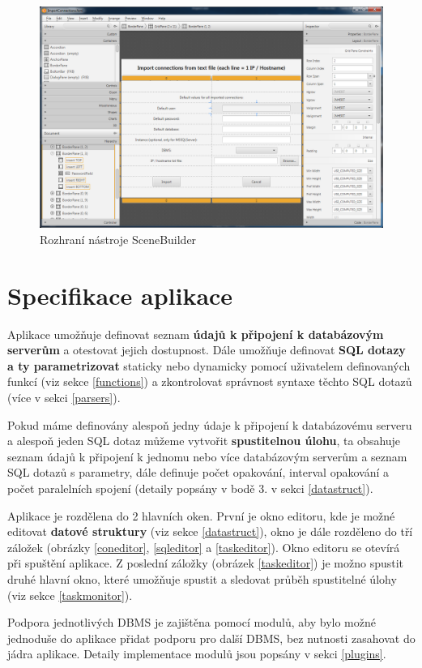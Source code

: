 \documentclass[czech,bachelor,public,dept460,male,cpdeclaration,twoside]{diploma}
\begin{document}
\begin{figure}[!h]\centering\includegraphics[width=1.0\textwidth]{Figures/SceneBuilder.png}\caption{Rozhraní nástroje SceneBuilder}
\end{figure}

\section{Specifikace aplikace}
Aplikace umožňuje definovat seznam \textbf{údajů k připojení k databázovým serverům} a otestovat jejich dostupnost. Dále umožňuje definovat \textbf{SQL dotazy a ty parametrizovat} staticky nebo dynamicky pomocí uživatelem definovaných funkcí (viz sekce \ref{functions}) a zkontrolovat správnost syntaxe těchto SQL dotazů (více v sekci \ref{parsers}).

Pokud máme definovány alespoň jedny údaje k připojení k databázovému serveru a alespoň jeden SQL dotaz můžeme vytvořit \textbf{spustitelnou úlohu}, ta obsahuje seznam údajů k připojení k jednomu nebo více databázovým serverům a seznam SQL dotazů s parametry, dále definuje počet opakování, interval opakování a počet paralelních spojení (detaily popsány v bodě 3. v sekci \ref{datastruct}). 

Aplikace je rozdělena do 2 hlavních oken. První je okno editoru, kde je možné editovat \textbf{datové struktury} (viz sekce \ref{datastruct}), okno je dále rozděleno do tří záložek (obrázky \ref{coneditor}, \ref{sqleditor} a \ref{taskeditor}). Okno editoru se otevírá při spuštění aplikace. Z poslední záložky (obrázek \ref{taskeditor}) je možno spustit druhé hlavní okno, které umožňuje spustit a sledovat průběh spustitelné úlohy (viz sekce \ref{taskmonitor}).

Podpora jednotlivých DBMS je zajištěna pomocí modulů, aby bylo možné jednoduše do aplikace přidat podporu pro další DBMS, bez nutnosti zasahovat do jádra aplikace. Detaily implementace modulů jsou popsány v sekci \ref{plugins}.
\end{document}
